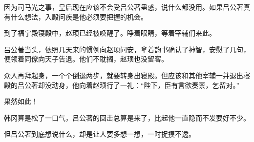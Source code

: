 因为司马光之事，皇后现在应该不会受吕公著蛊惑，说什么都没用。如果吕公著真有什么想法，入殿问疾是他必须要把握的机会。 

到了福宁殿寝殿中，赵顼已经被唤醒了。睁着眼睛，等着宰辅们来此。 

吕公著当头，依照几天来的惯例向赵顼问安，拿着韵书确认了神智，安慰了几句，便领着同僚向天子告退。他们不耽搁，赵顼也没留客。 

众人再拜起身，一个个倒退两步，就要转身出寝殿。但应该和其他宰辅一并退出寝殿的吕公著却没动身，他向着赵顼行了一礼：“陛下，臣有言欲奏禀，乞留对。” 

果然如此！ 

韩冈算是松了一口气，吕公著的回击总算是来了，比起他一直隐而不发要好不少。 

但吕公著到底想说什么，却是让人要多想一想，一时捉摸不透。 

